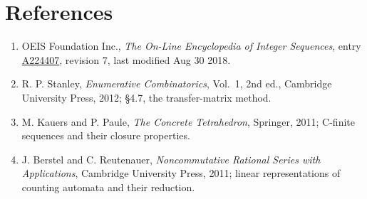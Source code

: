 \documentclass[11pt]{article}
\theoremstyle{definition}
\begin{document}
\section{References}

\begin{enumerate}

\item OEIS Foundation Inc., \emph{The On-Line Encyclopedia of Integer Sequences}, entry \href{https://oeis.org/A224407}{A224407}, revision 7, last modified Aug 30 2018.

\item R. P. Stanley, \emph{Enumerative Combinatorics}, Vol.~1, 2nd ed., Cambridge University Press, 2012; \S4.7, the transfer-matrix method.

\item M. Kauers and P. Paule, \emph{The Concrete Tetrahedron}, Springer, 2011; C-finite sequences and their closure properties.

\item J. Berstel and C. Reutenauer, \emph{Noncommutative Rational Series with Applications}, Cambridge University Press, 2011; linear representations of counting automata and their reduction.

\end{enumerate}
\end{document}
